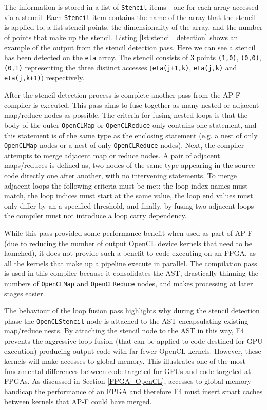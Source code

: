 \documentclass{mpaper}
\begin{document}
The information is stored in a list of \texttt{Stencil} items - one for each array accessed via a stencil. 
Each \texttt{Stencil} item contains the name of the array that the stencil is applied to, a list stencil points, the dimensionality of the array, and the number of points that make up the stencil.
Listing \ref{lst:stencil_detection} shows an example of the output from the stencil detection pass.
Here we can see a stencil has been detected on the \texttt{eta} array.
The stencil consists of 3 points \texttt{(1,0)}, \texttt{(0,0)}, \texttt{(0,1)} representing the three distinct accesses (\texttt{eta(j+1,k)}, \texttt{eta(j,k)} and \texttt{eta(j,k+1)}) respectively.


After the stencil detection process is complete another pass from the AP-F compiler is executed.
This pass aims to fuse together as many nested or adjacent map/reduce nodes as possible.
The criteria for fusing nested loops is that the body of the outer \texttt{OpenCLMap} or \texttt{OpenCLReduce} only contains one statement, and this statement is of the same type as the enclosing statement (e.g. a nest of only \texttt{OpenCLMap} nodes or a nest of only \texttt{OpenCLReduce} nodes).
Next, the compiler attempts to merge adjacent map or reduce nodes.
A pair of adjacent maps/reduces is defined as, two nodes of the same type appearing in the source code directly one after another, with no intervening statements.
To merge adjacent loops the following criteria must be met: the loop index names must match, the loop indices must start at the same value, the loop end values must only differ by an a specified threshold, and finally, by fusing two adjacent loops the compiler must not introduce a loop carry dependency. 

While this pass provided some performance benefit when used as part of AP-F (due to reducing the number of output OpenCL device kernels that need to be launched), it does not provide such a benefit to code executing on an FPGA, as all the kernels that make up a pipeline execute in parallel. 
The compilation pass is used in this compiler because it consolidates the AST, drastically thinning the numbers of \texttt{OpenCLMap} and \texttt{OpenCLReduce} nodes, and makes processing at later stages easier.  

The behaviour of the loop fusion pass highlights why during the stencil detection phase the \texttt{OpenCLStencil} node is attached to the AST encapsulating existing map/reduce nests.
By attaching the stencil node to the AST in this way, F4 prevents the aggressive loop fusion (that can be applied to code destined for GPU execution) producing output code with far fewer OpenCL kernels.
However, these kernels will make accesses to global memory.
This illustrates one of the most fundamental differences between code targeted for GPUs and code targeted at FPGAs. 
As discussed in Section \ref{FPGA_OpenCL}, accesses to global memory handicap the performance of an FPGA and therefore F4 must insert smart caches between kernels that AP-F could have merged.
\end{document}
